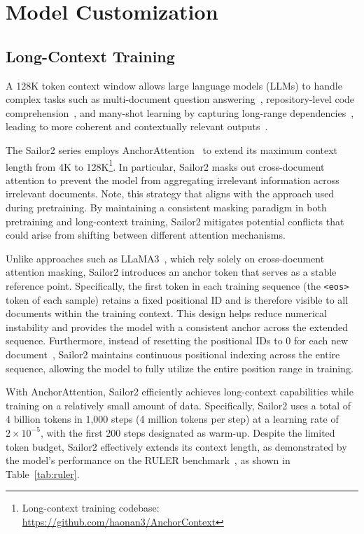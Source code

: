 \section{Model Customization}

\subsection{Long-Context Training}

A 128K token context window allows large language models (LLMs) to handle complex tasks such as multi-document question answering~\citep{wang2024leave}, repository-level code comprehension~\citep{jimenez2024swebench}, and many-shot learning by capturing long-range dependencies~\citep{agarwal2024many}, leading to more coherent and contextually relevant outputs~\citep{mazumder2022lifelong}.

The Sailor2 series employs AnchorAttention~\citep{wang2024precision} to extend its maximum context length from 4K to 128K\footnote{Long-context training codebase: \url{https://github.com/haonan3/AnchorContext}}. In particular, Sailor2 masks out cross-document attention to prevent the model from aggregating irrelevant information across irrelevant documents. Note, this strategy that aligns with the approach used during pretraining. By maintaining a consistent masking paradigm in both pretraining and long-context training, Sailor2 mitigates potential conflicts that could arise from shifting between different attention mechanisms.

Unlike approaches such as LLaMA3~\citep{llama3}, which rely solely on cross-document attention masking, Sailor2 introduces an anchor token that serves as a stable reference point. Specifically, the first token in each training sequence (the \texttt{<eos>} token of each sample) retains a fixed positional ID and is therefore visible to all documents within the training context. This design helps reduce numerical instability and provides the model with a consistent anchor across the extended sequence. Furthermore, instead of resetting the positional IDs to $0$ for each new document~\citep{zhao-etal-2024-analysing}, Sailor2 maintains continuous positional indexing across the entire sequence, allowing the model to fully utilize the entire position range in training.

With AnchorAttention, Sailor2 efficiently achieves long-context capabilities while training on a relatively small amount of data. Specifically, Sailor2 uses a total of 4 billion tokens in 1,000 steps (4 million tokens per step) at a learning rate of \(2 \times 10^{-5}\), with the first 200 steps designated as warm-up. Despite the limited token budget, Sailor2 effectively extends its context length, as demonstrated by the model’s performance on the RULER benchmark~\citep{ruler}, as shown in Table~\ref{tab:ruler}.

